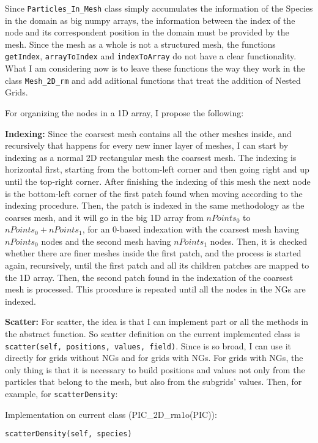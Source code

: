 \documentclass[reprint,aps]{revtex4-1}
\begin{document}
Since \texttt{Particles\_In\_Mesh} class simply accumulates the information of the Species in the domain as big numpy arrays, the information between the index of the node and its correspondent position in the domain must be provided by the mesh. Since the mesh as a whole is not a structured mesh, the functions \texttt{getIndex}, \texttt{arrayToIndex} and \texttt{indexToArray} do not have a clear functionality. What I am considering now is to leave these functions the way they work in the class \texttt{Mesh\_2D\_rm} and add aditional functions that treat the addition of Nested Grids.

For organizing the nodes in a 1D array, I propose the following:

\textbf{Indexing:} Since the coarsest mesh contains all the other meshes inside, and recursively that happens for every new inner layer of meshes, I can start by indexing as a normal 2D rectangular mesh the coarsest mesh. The indexing is horizontal first, starting from the bottom-left corner and then going right and up until the top-right corner. After finishing the indexing of this mesh the next node is the bottom-left corner of the first patch found when moving according to the indexing procedure. Then, the patch is indexed in the same methodology as the coarses mesh, and it will go in the big 1D array from $nPoints_{0}$ to $nPoints_{0}+nPoints_{1}$, for an 0-based indexation with the coarsest mesh having $nPoints_{0}$ nodes and the second mesh having $nPoints_{1}$ nodes. Then, it is checked whether there are finer meshes inside the first patch, and the process is started again, recursively, until the first patch and all its children patches are mapped to the 1D array. Then, the second patch found in the indexation of the coarsest mesh is processed. This procedure is repeated until all the nodes in the NGs are indexed.

\textbf{Scatter:} For scatter, the idea is that I can implement part or all the methods in the abstract function. So scatter definition on the current implemented class is \texttt{scatter(self, positions, values, field)}. Since is so broad, I can use it directly for grids without NGs and for grids with NGs. For grids with NGs, the only thing is that it is necessary to build positions and values not only from the particles that belong to the mesh, but also from the subgrids' values. Then, for example, for \texttt{scatterDensity}:

Implementation on current class (PIC\_2D\_rm1o(PIC)):

\texttt{scatterDensity(self, species)}
\end{document}
